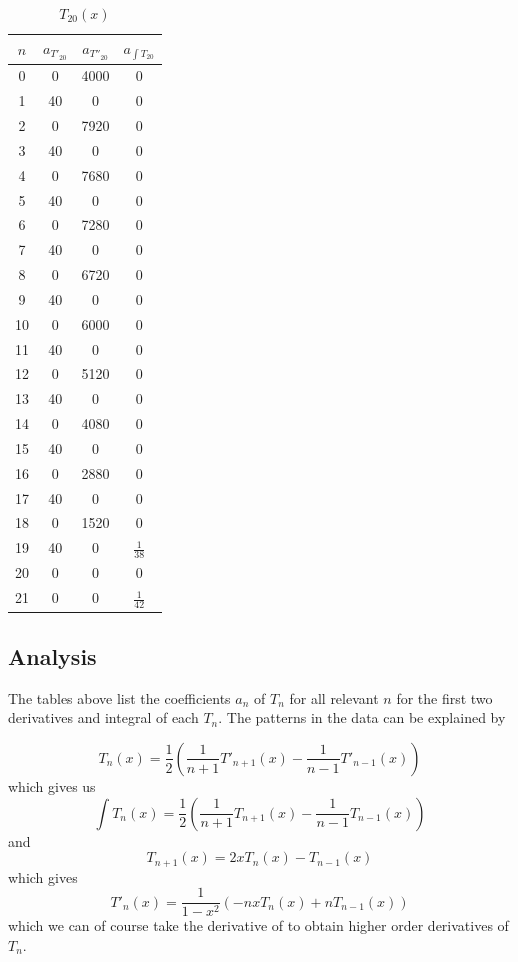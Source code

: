 \documentclass[11pt]{article} %
\begin{document}
{{\begin{table}[H]
\begin{minipage}{.5\linewidth}
\centering
\caption*{$T_{20}(x)$}
\begin{tabular}{| c | c | c | c |}
\hline 
$n$ & $a_{T'_{20}}$ & $a_{T''_{20}}$ & $a_{\int T_{20}}$ \\
\hline \hline
0 & 0 & 4000 & 0\\
1 & 40 & 0 & 0\\
2 & 0& 7920 & 0\\
3 & 40& 0& 0\\
4 & 0 & 7680& 0\\
5 & 40 & 0 & 0\\
6 & 0 & 7280 & 0\\
7 & 40 & 0 & 0\\
8 & 0 & 6720 & 0\\
9 & 40 & 0 & 0\\
10 & 0 & 6000 & 0\\
11 &  40& 0& 0\\
12 &  0& 5120& 0\\
13 &  40& 0& 0\\
14 &  0& 4080& 0\\
15 &  40& 0& 0\\
16 &  0& 2880& 0\\
17 &  40& 0& 0\\
18 &  0& 1520& 0\\
19 &  40& 0&  $\frac{1}{38}$\\
20 &  0& 0& 0\\
21 &  0& 0& $\frac{1}{42}$\\
\hline
\end{tabular}
\end{minipage}
\end{table}

\subsection*{Analysis}
The tables above list the coefficients $a_n$ of $T_n$ for all relevant $n$ for the first two derivatives and integral of each $T_n$. The patterns in the data can be explained by

$$T_n(x) = \frac{1}{2} \left( \frac{1}{n+1}T'_{n+1}(x) - \frac{1}{n-1}T'_{n-1}(x) \right)$$
which gives us 
$$\int T_n(x) = \frac{1}{2} \left(  \frac{1}{n+1}T_{n+1}(x) - \frac{1}{n-1}T_{n-1}(x) \right)$$
and
$$T_{n+1}(x) = 2xT_n(x) - T_{n-1}(x)$$
which gives
$$T'_n(x) = \frac{1}{1-x^2} \left( -nxT_n(x) + nT_{n-1}(x) \right)$$
which we can of course take the derivative of to obtain higher order derivatives of $T_n$.
}}
\end{document}
